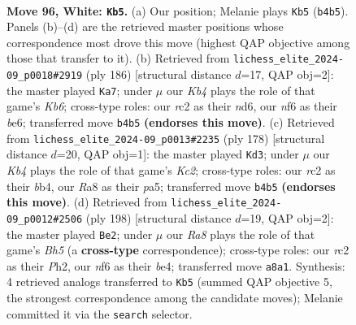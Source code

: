 \documentclass[11pt]{article}
\begin{document}
\clearpage

\begin{figure}[p]\centering
\begin{subfigure}{0.46\textwidth}\centering
\resizebox{\linewidth}{!}{%
\newchessgame
\chessboard[
  setfen={R7/8/5n1p/4p3/1K1p2kb/8/2r5/8 w - - 10 96},
  showmover=false,
  pgfstyle=straightmove, color=movearrow, markmove={b4-b5}
]}
\caption{}
\end{subfigure}\hfill
\begin{subfigure}{0.46\textwidth}\centering
\resizebox{\linewidth}{!}{%
\newchessgame
\chessboard[
  setfen={8/6p1/1K1nb2p/5k2/8/8/8/8 w - - 28 94},
  showmover=false,
  pgfstyle=straightmove, color=movearrow, markmove={b6-a7}
]}
\caption{}
\end{subfigure}
\\[4pt]
\begin{subfigure}{0.46\textwidth}\centering
\resizebox{\linewidth}{!}{%
\newchessgame
\chessboard[
  setfen={1k6/7p/8/pp4p1/1b6/8/2K5/8 w - - 42 90},
  showmover=false,
  pgfstyle=straightmove, color=movearrow, markmove={c2-d3}
]}
\caption{}
\end{subfigure}\hfill
\begin{subfigure}{0.46\textwidth}\centering
\resizebox{\linewidth}{!}{%
\newchessgame
\chessboard[
  setfen={8/8/8/p2k2pB/P3b3/2K5/7P/8 w - - 70 100},
  showmover=false,
  pgfstyle=straightmove, color=movearrow, markmove={h5-e2}
]}
\caption{}
\end{subfigure}
\caption{\textbf{Move 96, White: \texttt{Kb5}.} (a) Our position; Melanie plays \texttt{Kb5} (\texttt{b4b5}). Panels (b)--(d) are the retrieved master positions whose correspondence most drove this move (highest QAP objective among those that transfer to it). (b) Retrieved from \texttt{lichess\_elite\_2024-09\_p0018\#2919} (ply 186) [structural distance $d$=17, QAP obj=2]: the master played \texttt{Ka7}; under $\mu$ our \emph{Kb4} plays the role of that game's \emph{Kb6}; cross-type roles: our \emph{r}c2 as their \emph{n}d6, our \emph{n}f6 as their \emph{b}e6; transferred move \texttt{b4b5} \textbf{(endorses this move)}. (c) Retrieved from \texttt{lichess\_elite\_2024-09\_p0013\#2235} (ply 178) [structural distance $d$=20, QAP obj=1]: the master played \texttt{Kd3}; under $\mu$ our \emph{Kb4} plays the role of that game's \emph{Kc2}; cross-type roles: our \emph{r}c2 as their \emph{b}b4, our \emph{R}a8 as their \emph{p}a5; transferred move \texttt{b4b5} \textbf{(endorses this move)}. (d) Retrieved from \texttt{lichess\_elite\_2024-09\_p0012\#2506} (ply 198) [structural distance $d$=19, QAP obj=2]: the master played \texttt{Be2}; under $\mu$ our \emph{Ra8} plays the role of that game's \emph{Bh5} (a \textbf{cross-type} correspondence); cross-type roles: our \emph{r}c2 as their \emph{P}h2, our \emph{n}f6 as their \emph{b}e4; transferred move \texttt{a8a1}. Synthesis: 4 retrieved analogs transferred to \texttt{Kb5} (summed QAP objective 5, the strongest correspondence among the candidate moves); Melanie committed it via the \texttt{search} selector.}
\label{fig:thought-m190}
\end{figure}
\end{document}

